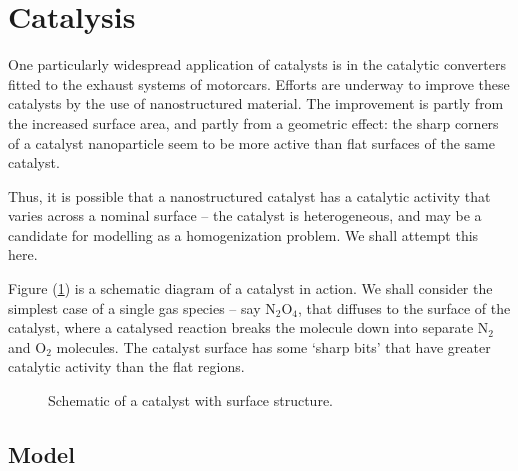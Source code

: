 \documentclass[12pt, a4paper, twoside, openright]{book}
\begin{document}
\clearpage
\section{Catalysis}

One particularly widespread application of catalysts is in the catalytic converters fitted to the exhaust systems of motorcars.  Efforts are underway to improve these catalysts by the use of nanostructured material.  The improvement is partly from the increased surface area, and partly from a geometric effect: the sharp corners of a catalyst nanoparticle seem to be more active than flat surfaces of the same catalyst.

Thus, it is possible that a nanostructured catalyst has a catalytic activity that varies across a nominal surface  -- the catalyst is heterogeneous, and may be a candidate for modelling as a homogenization problem.  We shall attempt this here.

\vspace*{1em}
Figure (\ref{catalyst}) is a schematic diagram of a catalyst in action.  We shall consider the simplest case of a single gas species -- say N$_2$O$_4$, that diffuses to the surface of the catalyst, where a catalysed reaction breaks the molecule down into separate N$_2$ and O$_2$ molecules.  The catalyst surface has some `sharp bits' that have greater catalytic activity than the flat regions.



\begin{figure}[ht]
\centering
{}
\caption{Schematic of a catalyst with surface structure.}\label{catalyst}
\end{figure}

\subsection{Model}
\end{document}
